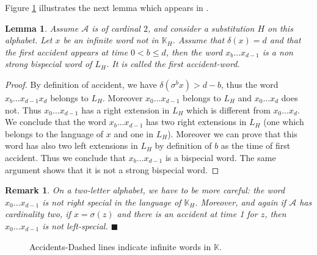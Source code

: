 \documentclass[11 pt]{article}
\newtheorem{lemma}[proposition]{Lemma}
\newtheorem{remark}[proposition]{Remark}
\def\K{{\mathbb K}}
\newcommand {\CA}{{\mathcal A}}
\def\s{\sigma}
\theoremstyle{definition}
\begin{document}
Figure \ref{fig-accidents} illustrates the next lemma which appears in \cite{Bruin-Leplaid-13}. 
\begin{lemma}\label{lem:accident-bispecial}
Assume $\mathcal{A}$ is of cardinal $2$, and consider a substitution $H$ on this alphabet. Let $x$ be an infinite word not in $\mathbb K_H$.
Assume that $\delta(x)=d$ and that the first accident appears at time $0<b\leq d$, then the word $x_b\dots x_{d-1}$ is a non strong bispecial word of $L_{H}$. It is called the first accident-word. 
\end{lemma}
\begin{proof}
By definition of accident, we have $\delta(\sigma^bx)>d-b$, thus the word $x_b\dots x_{d-1}x_d$ belongs to $L_{H}$. Moreover $x_0\dots x_{d-1}$ belongs to $L_H$ and $x_0\dots x_d$ does not. Thus $x_0\dots x_{d-1}$ has a right extension in $L_{H}$ which is different from $x_0\dots x_d$. We conclude that the word $x_b\dots x_{d-1}$ has two right extensions in $L_{H}$ (one which belongs to the language of $x$ and one in $L_H$). Moreover we can prove that this word has also two left extensions in $L_{H}$ by definition of $b$ as the time of first accident. 
Thus we conclude that $x_b\dots x_{d-1}$ is a bispecial word. The same argument shows that it is not a strong bispecial word.
\end{proof}

\begin{remark}
\label{rem-acci-left-rigthspe} On a two-letter alphabet, we have to be more careful: the word $x_0\dots x_{d-1}$ is not right special in the language of $\K_H$. Moreover, and again if $\CA$ has cardinality two, if $x=\s(z)$ and there is an accident at time 1 for $z$, then $x_0\dots x_{d-1}$ is not left-special.
$\blacksquare$\end{remark}


\begin{center}
\begin{figure}[htbp]
\caption{Accidents-Dashed lines indicate infinite words in $\mathbb K$.}\label{fig-accidents}
\end{figure}
\end{center}
\end{document}
